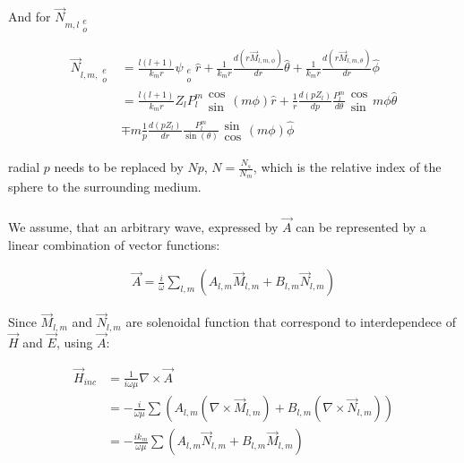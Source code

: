             And for $\vec{N}_{m,l\substack{e\\ o}}$

            \begin{align}
                \vec{N}_{l,m,\substack{e\\ o}} &= \frac{l(l+1)}{k_mr}\psi_{\substack{e\\ o}}\hat{r}
                    + \frac{1}{k_mr}\frac{d(r\vec{M}_{l,m,\phi})}{dr} \hat{\theta} + \frac{1}{k_m r}\frac{d(r\vec{M}_{l,m,\theta})}{dr}\hat{\phi} \\
                &= \frac{l(l+1)}{k_mr}Z_l P_l^m \substack{\cos\\\sin}(m\phi) \hat{r}
                    + \frac{1}{r}\frac{d(pZ_l)}{dp}\frac{P_l^m}{d\theta}\substack{\cos\\\sin}m\phi\hat{\theta}  \\
                &\mp m\frac{1}{p}\frac{d(pZ_l)}{dr}\frac{P_l^m}{\sin(\theta)}\substack{\sin\\\cos}(m\phi)\hat{\phi}
            \end{align}

            radial $p$ needs to be replaced by $Np$, $N = \frac{N_s}{N_m}$, which is the relative index of the sphere to the surrounding
            medium.


        \subsubsection{}
            We assume, that an arbitrary wave, expressed by $\vec{A}$ can be represented by a linear combination of vector functions:

            \begin{align}
                \vec{A} = \frac{i}{\omega}\sum_{l,m}\left(A_{l,m}\vec{M}_{l,m}+B_{l,m}\vec{N}_{l,m}\right)
            \end{align}

            Since $\vec{M}_{l,m}$ and $\vec{N}_{l,m}$ are solenoidal function that correspond to interdependece of $\vec{H}$ and $\vec{E}$, using $\vec{A}$:

            \begin{align}
                \vec{H}_{inc} &= \frac{1}{i\omega \mu}\nabla \times \vec{A} \\
                &= - \frac{i}{\omega\mu}\sum\left(A_{l,m}(\nabla\times\vec{M}_{l,m}) + B_{l,m}(\nabla\times\vec{N}_{l,m})\right) \\
                &= - \frac{ik_m}{\omega\mu}\sum\left(A_{l,m}\vec{N}_{l,m}+B_{l,m}\vec{M}_{l,m}\right)
            \end{align}

